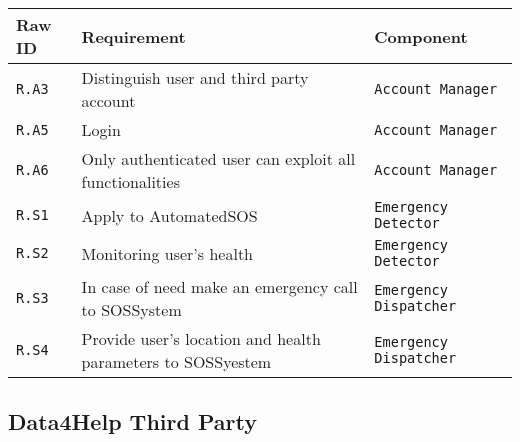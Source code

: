 \documentclass[../DD0.tex]{subfiles}
\begin{document}
    \begin{table}[h!]
      \centering
      \begin{tabularx}{.8\linewidth}{|X|X|X|}
        \hline
        \textbf{Raw ID} & \textbf{Requirement} & \textbf{Component} \\ \hline
        \texttt{R.A3} & Distinguish user and third party account & \texttt{Account Manager} \\
        \hline
        \texttt{R.A5} & Login & \texttt{Account Manager} \\
        \hline
       \texttt{R.A6} & Only authenticated user can exploit all functionalities & \texttt{Account Manager} \\
        \hline
        \texttt{R.S1}  & Apply to AutomatedSOS & \texttt{Emergency Detector} \\
        \hline
        \texttt{R.S2}  & Monitoring user's health & \texttt{Emergency Detector} \\
        \hline
        \texttt{R.S3}  & In case of need make an emergency call to SOSSystem & \texttt{Emergency Dispatcher} \\
        \hline
        \texttt{R.S4}  & Provide user's location and health parameters to SOSSyestem & \texttt{Emergency Dispatcher} \\
        \hline
      \end{tabularx}
      \label{tab:auto}
    \end{table}

\subsection{Data4Help Third Party}
\end{document}
